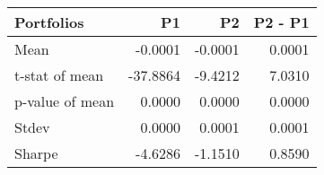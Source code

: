 \begin{tabular}{lrrr}
\toprule
Portfolios & P1 & P2 & P2 - P1 \\
\midrule
Mean & -0.0001 & -0.0001 & 0.0001 \\
t-stat of mean & -37.8864 & -9.4212 & 7.0310 \\
p-value of mean & 0.0000 & 0.0000 & 0.0000 \\
Stdev & 0.0000 & 0.0001 & 0.0001 \\
Sharpe & -4.6286 & -1.1510 & 0.8590 \\
\bottomrule
\end{tabular}
